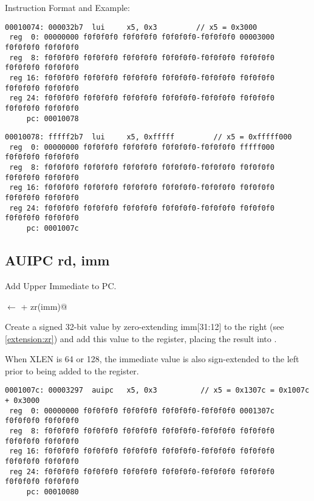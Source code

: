 Instruction Format and Example:


\begin{verbatim}
00010074: 000032b7  lui     x5, 0x3         // x5 = 0x3000
 reg  0: 00000000 f0f0f0f0 f0f0f0f0 f0f0f0f0-f0f0f0f0 00003000 f0f0f0f0 f0f0f0f0
 reg  8: f0f0f0f0 f0f0f0f0 f0f0f0f0 f0f0f0f0-f0f0f0f0 f0f0f0f0 f0f0f0f0 f0f0f0f0
 reg 16: f0f0f0f0 f0f0f0f0 f0f0f0f0 f0f0f0f0-f0f0f0f0 f0f0f0f0 f0f0f0f0 f0f0f0f0
 reg 24: f0f0f0f0 f0f0f0f0 f0f0f0f0 f0f0f0f0-f0f0f0f0 f0f0f0f0 f0f0f0f0 f0f0f0f0
     pc: 00010078
\end{verbatim}


\begin{verbatim}
00010078: fffff2b7  lui     x5, 0xfffff         // x5 = 0xfffff000
 reg  0: 00000000 f0f0f0f0 f0f0f0f0 f0f0f0f0-f0f0f0f0 fffff000 f0f0f0f0 f0f0f0f0
 reg  8: f0f0f0f0 f0f0f0f0 f0f0f0f0 f0f0f0f0-f0f0f0f0 f0f0f0f0 f0f0f0f0 f0f0f0f0
 reg 16: f0f0f0f0 f0f0f0f0 f0f0f0f0 f0f0f0f0-f0f0f0f0 f0f0f0f0 f0f0f0f0 f0f0f0f0
 reg 24: f0f0f0f0 f0f0f0f0 f0f0f0f0 f0f0f0f0-f0f0f0f0 f0f0f0f0 f0f0f0f0 f0f0f0f0
     pc: 0001007c
\end{verbatim}


\subsection{AUIPC rd, imm}

Add Upper Immediate to PC.

\verb@rd@ $\leftarrow$ \verb@pc + zr(imm)@

Create a signed 32-bit value by zero-extending imm[31:12] to the 
right (see \autoref{extension:zr}) and add this value to the 
 register, placing the result into .

When XLEN is 64 or 128, the immediate value is also sign-extended 
to the left prior to being added to the  register.

\begin{verbatim}
0001007c: 00003297  auipc   x5, 0x3          // x5 = 0x1307c = 0x1007c + 0x3000
 reg  0: 00000000 f0f0f0f0 f0f0f0f0 f0f0f0f0-f0f0f0f0 0001307c f0f0f0f0 f0f0f0f0
 reg  8: f0f0f0f0 f0f0f0f0 f0f0f0f0 f0f0f0f0-f0f0f0f0 f0f0f0f0 f0f0f0f0 f0f0f0f0
 reg 16: f0f0f0f0 f0f0f0f0 f0f0f0f0 f0f0f0f0-f0f0f0f0 f0f0f0f0 f0f0f0f0 f0f0f0f0
 reg 24: f0f0f0f0 f0f0f0f0 f0f0f0f0 f0f0f0f0-f0f0f0f0 f0f0f0f0 f0f0f0f0 f0f0f0f0
     pc: 00010080
\end{verbatim}

